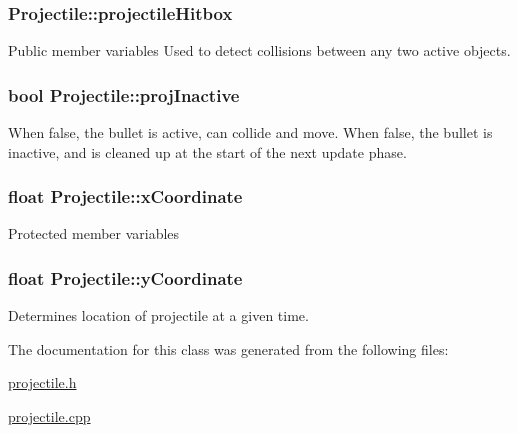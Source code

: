 \subsubsection[{\texorpdfstring{projectile\+Hitbox}{projectileHitbox}}]{ Projectile\+::projectile\+Hitbox}\hypertarget{class_projectile_ae0036dcb811aabf0228f768700491790}{}\label{class_projectile_ae0036dcb811aabf0228f768700491790}
Public member variables Used to detect collisions between any two active objects. 
\subsubsection[{\texorpdfstring{proj\+Inactive}{projInactive}}]{\setlength{\rightskip}{0pt plus 5cm}bool Projectile\+::proj\+Inactive}\hypertarget{class_projectile_aae745fd2564addc23d5456fe5fd1a711}{}\label{class_projectile_aae745fd2564addc23d5456fe5fd1a711}
When false, the bullet is active, can collide and move. When false, the bullet is inactive, and is cleaned up at the start of the next update phase. 
\subsubsection[{\texorpdfstring{x\+Coordinate}{xCoordinate}}]{\setlength{\rightskip}{0pt plus 5cm}float Projectile\+::x\+Coordinate\hspace{0.3cm}{\ttfamily [protected]}}\hypertarget{class_projectile_a744bb0d2fd11da1750ab875ceea4b5cb}{}\label{class_projectile_a744bb0d2fd11da1750ab875ceea4b5cb}
Protected member variables 
\subsubsection[{\texorpdfstring{y\+Coordinate}{yCoordinate}}]{\setlength{\rightskip}{0pt plus 5cm}float Projectile\+::y\+Coordinate\hspace{0.3cm}{\ttfamily [protected]}}\hypertarget{class_projectile_a23383eb9240ee101dbdacbcc87b0a920}{}\label{class_projectile_a23383eb9240ee101dbdacbcc87b0a920}
Determines location of projectile at a given time. 

The documentation for this class was generated from the following files\+:\begin{DoxyCompactItemize}
\item 
\hyperlink{projectile_8h}{projectile.\+h}\item 
\hyperlink{projectile_8cpp}{projectile.\+cpp}\end{DoxyCompactItemize}
